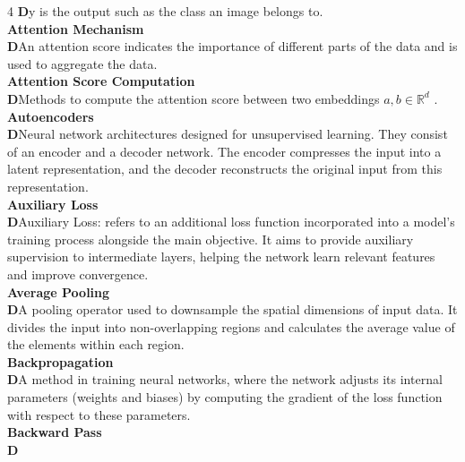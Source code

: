 \documentclass[8pt]{extarticle}
\newcommand{\dtag}{\textcolor{definitioncolor}{\tiny\textbf{D}}\;}
\begin{document}
\begin{multicols}{4}
\dtag y is the output such as the class an image belongs to.\\
\vspace{2pt}\textbf{Attention Mechanism}\\
\dtag An attention score indicates the importance of different parts of the data and is used to aggregate the data.\\
\vspace{2pt}\textbf{Attention Score Computation}\\
\dtag Methods to compute the attention score between two embeddings $a, b \in \mathbb{R}^{d}$ .\\
\vspace{2pt}\textbf{Autoencoders}\\
\dtag Neural network architectures designed for unsupervised learning. They consist of an encoder and a decoder network. The encoder compresses the input into a latent representation, and the decoder reconstructs the original input from this representation.\\
\vspace{2pt}\textbf{Auxiliary Loss}\\
\dtag Auxiliary Loss: refers to an additional loss function incorporated into a model's training process alongside the main objective. It aims to provide auxiliary supervision to intermediate layers, helping the network learn relevant features and improve convergence.\\
\vspace{2pt}\textbf{Average Pooling}\\
\dtag A pooling operator used to downsample the spatial dimensions of input data. It divides the input into non-overlapping regions and calculates the average value of the elements within each region.\\
\vspace{2pt}\textbf{Backpropagation}\\
\dtag A method in training neural networks, where the network adjusts its internal parameters (weights and biases) by computing the gradient of the loss function with respect to these parameters.\\
\vspace{2pt}\textbf{Backward Pass}\\
\dtag \\


\end{multicols}
\end{document}

